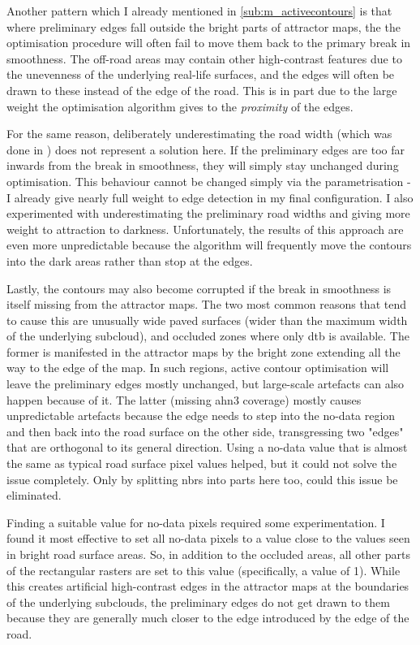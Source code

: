 Another pattern which I already mentioned in \ref{sub:m_activecontours} is that where preliminary edges fall outside the bright parts of attractor maps, the the optimisation procedure will often fail to move them back to the primary break in smoothness. The off-road areas may contain other high-contrast features due to the unevenness of the underlying real-life surfaces, and the edges will often be drawn to these instead of the edge of the road. This is in part due to the large weight the optimisation algorithm gives to the \textit{proximity} of the edges.

For the same reason, deliberately underestimating the road width (which was done in \cite{boyko_funkhauser_2011}) does not represent a solution here. If the preliminary edges are too far inwards from the break in smoothness, they will simply stay unchanged during optimisation. This behaviour cannot be changed simply via the parametrisation - I already give nearly full weight to edge detection in my final configuration. I also experimented with underestimating the preliminary road widths and giving more weight to attraction to darkness. Unfortunately, the results of this approach are even more unpredictable because the algorithm will frequently move the contours into the dark areas rather than stop at the edges.

Lastly, the contours may also become corrupted if the break in smoothness is itself missing from the attractor maps. The two most common reasons that tend to cause this are unusually wide paved surfaces (wider than the maximum width of the underlying subcloud), and occluded zones where only \ac{dtb} is available. The former is manifested in the attractor maps by the bright zone extending all the way to the edge of the map. In such regions, active contour optimisation will leave the preliminary edges mostly unchanged, but large-scale artefacts can also happen because of it. The latter (missing \ac{ahn3} coverage) mostly causes unpredictable artefacts because the edge needs to step into the no-data region and then back into the road surface on the other side, transgressing two "edges" that are orthogonal to its general direction. Using a no-data value that is almost the same as typical road surface pixel values helped, but it could not solve the issue completely. Only by splitting \ac{nbrs} into parts here too, could this issue be eliminated.

Finding a suitable value for no-data pixels required some experimentation. I found it most effective to set all no-data pixels to a value close to the values seen in bright road surface areas. So, in addition to the occluded areas, all other parts of the rectangular rasters are set to this value (specifically, a value of 1). While this creates artificial high-contrast edges in the attractor maps at the boundaries of the underlying subclouds, the preliminary edges do not get drawn to them because they are generally much closer to the edge introduced by the edge of the road.

